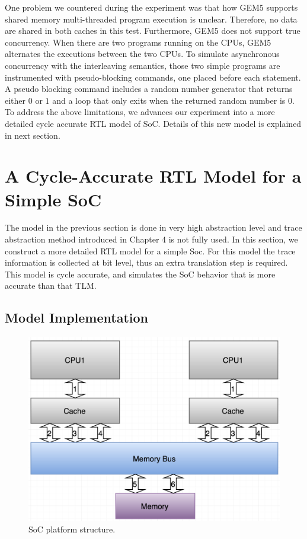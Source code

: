 \documentclass[12pt,frontmatter,copyright,thesis]{usfmanus}
\begin{document}
One problem we countered during the experiment  was that
how GEM5 supports shared memory
multi-threaded program execution is unclear. 
Therefore,
no data are shared in both caches in this test.
Furthermore, GEM5 does not support true concurrency.  When
there are two programs running on the CPUs, GEM5 alternates
the executions between the two CPUs.  To simulate
asynchronous concurrency with the interleaving semantics,
those two simple programs are instrumented with
pseudo-blocking commands, one placed before each statement.
A pseudo blocking command includes a random number generator
that returns either $0$ or $1$ and a loop that only exits
when the returned random number is $0$.
To address the above limitations,
we advances our experiment into a
more detailed cycle accurate RTL model of SoC. 
Details of this new model is explained in next section.



\section{A Cycle-Accurate RTL Model for a Simple SoC}
The model in the previous section is done in very high abstraction level and trace abstraction method
introduced in Chapter 4
is not fully used.
In this section, we construct a more detailed RTL model for a simple Soc.
For this model 
the trace information is collected at bit level, thus an extra translation step is required.
This model is cycle accurate, and simulates the SoC behavior that is more accurate than that TLM. 

\subsection{Model Implementation}

 \begin{figure} [h]
\centerline{
\includegraphics[width=5in]{RTL.png}}
\caption{SoC platform structure.}
\label{rtlstruc}
\end{figure}
\end{document}
